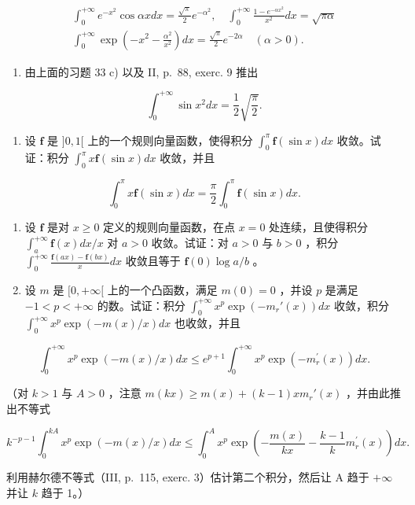 \[
\begin{array}{l} \int_ {0} ^ {+ \infty} e ^ {- x ^ {2}} \cos \alpha x d x = \frac {\sqrt {\pi}}{2} e ^ {- \alpha^ {2}}, \quad \int_ {0} ^ {+ \infty} \frac {1 - e ^ {- \alpha x ^ {2}}}{x ^ {2}} d x = \sqrt {\pi \alpha} \\ \int_ {0} ^ {+ \infty} \exp \left(- x ^ {2} - \frac {\alpha^ {2}}{x ^ {2}}\right) d x = \frac {\sqrt {\pi}}{2} e ^ {- 2 \alpha} \quad (\alpha > 0). \end{array}
\]

\begin{enumerate}
\def\labelenumi{\arabic{enumi})}
\setcounter{enumi}{35}
\tightlist
\item
  由上面的习题 33 c) 以及 II, p.~88, exerc. 9 推出
\end{enumerate}

\[
\int_ {0} ^ {+ \infty} \sin x ^ {2} d x = \frac {1}{2} \sqrt {\frac {\pi}{2}}.
\]

\begin{enumerate}
\def\labelenumi{\arabic{enumi})}
\setcounter{enumi}{36}
\tightlist
\item
  设 \(\mathbf{f}\) 是 \(]0, 1[\) 上的一个规则向量函数，使得积分 \(\int_0^\pi \mathbf{f}(\sin x) dx\) 收敛。试证：积分 \(\int_0^\pi x \mathbf{f}(\sin x) dx\) 收敛，并且
\end{enumerate}

\[
\int_ {0} ^ {\pi} x \mathbf {f} (\sin x) d x = \frac {\pi}{2} \int_ {0} ^ {\pi} \mathbf {f} (\sin x) d x.
\]

\begin{enumerate}
\def\labelenumi{\arabic{enumi})}
\setcounter{enumi}{37}
\item
  设 \(\mathbf{f}\) 是对 \(x \geqslant 0\) 定义的规则向量函数，在点 \(x = 0\) 处连续，且使得积分 \(\int_{a}^{+\infty} \mathbf{f}(x) dx / x\) 对 \(a > 0\) 收敛。试证：对 \(a > 0\) 与 \(b > 0\) ，积分 \(\int_{0}^{+\infty} \frac{\mathbf{f}(ax) - \mathbf{f}(bx)}{x} dx\) 收敛且等于 \(\mathbf{f}(0) \log a / b\) 。
\item
  设 \(m\) 是 \([0, +\infty[\) 上的一个凸函数，满足 \(m(0) = 0\) ，并设 \(p\) 是满足 \(-1 < p < +\infty\) 的数。试证：积分 \(\int_0^{+\infty} x^p \exp(-m_r'(x)) dx\) 收敛，积分 \(\int_0^{+\infty} x^p \exp(-m(x)/x) dx\) 也收敛，并且
\end{enumerate}

\[
\int_ {0} ^ {+ \infty} x ^ {p} \exp (- m (x) / x) d x \leqslant e ^ {p + 1} \int_ {0} ^ {+ \infty} x ^ {p} \exp (- m _ {r} ^ {\prime} (x)) d x.
\]

（对 \(k > 1\) 与 \(A > 0\) ，注意 \(m(kx) \geqslant m(x) + (k - 1)x m_r'(x)\) ，并由此推出不等式

\[
k ^ {- p - 1} \int_ {0} ^ {k A} x ^ {p} \exp (- m (x) / x) d x \leqslant \int_ {0} ^ {A} x ^ {p} \exp \left(- \frac {m (x)}{k x} - \frac {k - 1}{k} m _ {r} ^ {\prime} (x)\right) d x.
\]

利用赫尔德不等式（III, p.~115, exerc. 3）估计第二个积分，然后让 A 趋于 \(+\infty\) 并让 \(k\) 趋于 1。）

\setcounter{exercisegroup}{1}
